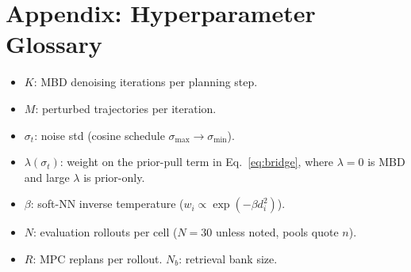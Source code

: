 \documentclass[letterpaper, 10 pt, conference]{ieeeconf}
\begin{document}
\section*{Appendix: Hyperparameter Glossary}

\begin{itemize}\setlength\itemsep{-2pt}\setlength\topsep{0pt}%
\setlength\parsep{0pt}\setlength\partopsep{0pt}
\item $K$: MBD denoising iterations per planning step.
\item $M$: perturbed trajectories per iteration.
\item $\sigma_t$: noise std (cosine schedule $\sigma_{\max}\!\to\!\sigma_{\min}$).
\item $\lambda(\sigma_t)$: weight on the prior-pull term in
Eq.~\ref{eq:bridge}, where $\lambda\!=\!0$ is MBD and large $\lambda$ is prior-only.
\item $\beta$: soft-NN inverse temperature ($w_i\!\propto\!\exp(-\beta d_i^2)$).
\item $N$: evaluation rollouts per cell ($N\!=\!30$ unless noted, pools quote $n$).
\item $R$: MPC replans per rollout. \quad $N_b$: retrieval bank size.
\end{itemize}
\end{document}
